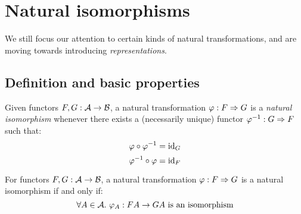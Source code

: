 \chapter{Natural isomorphisms}


We still focus our attention to certain kinds of natural transformations, and
are moving towards introducing \emph{representations}.

\section{Definition and basic properties}

\begin{definition}
Given functors $F, G : \mathcal{A} \to \mathcal{B}$, a natural transformation
$\varphi: F \Rightarrow G$ is a \emph{natural isomorphism} whenever there exists a
(necessarily unique) functor $\varphi^{-1}: G \Rightarrow F$ such that:
\[ \varphi \circ \varphi^{-1} = \mathrm{id}_{ G } \]
\[ \varphi^{-1} \circ \varphi = \mathrm{id}_{ F } \]
\end{definition}

\begin{theorem}
For functors $F, G : \mathcal{A} \to \mathcal{B}$, a natural transformation
$\varphi: F \Rightarrow G$ is a natural isomorphism if and only if:
\[ \forall A \in \mathcal{A}.\ \text{$\varphi_A: FA \to GA$ is an isomorphism} \]
\end{theorem}

